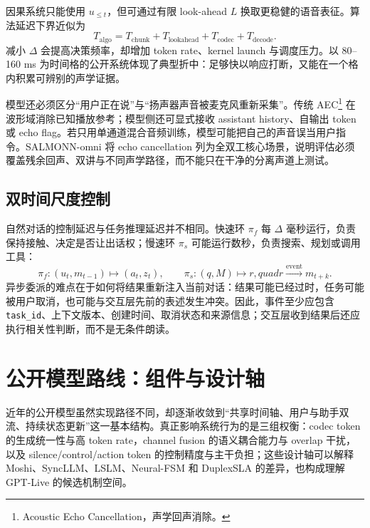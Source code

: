 因果系统只能使用 $u_{\le t}$，但可通过有限 look-ahead $L$ 换取更稳健的语音表征。算法延迟下界近似为
\begin{equation}
T_{\mathrm{algo}}=T_{\mathrm{chunk}}+T_{\mathrm{lookahead}}+T_{\mathrm{codec}}+T_{\mathrm{decode}}.
\end{equation}
减小 $\Delta$ 会提高决策频率，却增加 token rate、kernel launch 与调度压力。以 80--160 ms 为时间格的公开系统体现了典型折中：足够快以响应打断，又能在一个格内积累可辨别的声学证据\cite{defossez2024moshi,zhang2026duplexsla}。

模型还必须区分“用户正在说”与“扬声器声音被麦克风重新采集”。传统 AEC\footnote{Acoustic Echo Cancellation，声学回声消除。} 在波形域消除已知播放参考；模型侧还可显式接收 assistant history、自输出 token 或 echo flag。若只用单通道混合音频训练，模型可能把自己的声音误当用户指令。SALMONN-omni 将 echo cancellation 列为全双工核心场景\cite{yu2025salmonnomni}，说明评估必须覆盖残余回声、双讲与不同声学路径，而不能只在干净的分离声道上测试。

\subsection{双时间尺度控制}

自然对话的控制延迟与任务推理延迟并不相同。快速环 $\pi_f$ 每 $\Delta$ 毫秒运行，负责保持接触、决定是否让出话权；慢速环 $\pi_s$ 可能运行数秒，负责搜索、规划或调用工具：
\begin{equation}
\pi_f:(u_t,m_{t-1})\mapsto(a_t,z_t),\qquad
\pi_s:(q,M)\mapsto r,quad r\xrightarrow{\mathrm{event}}m_{t+k}.
\end{equation}
异步委派的难点在于如何将结果重新注入当前对话：结果可能已经过时，任务可能被用户取消，也可能与交互层先前的表述发生冲突。因此，事件至少应包含 \texttt{task\_id}、上下文版本、创建时间、取消状态和来源信息；交互层收到结果后还应执行相关性判断，而不是无条件朗读。

\section{公开模型路线：组件与设计轴}

近年的公开模型虽然实现路径不同，却逐渐收敛到“共享时间轴、用户与助手双流、持续状态更新”这一基本结构。真正影响系统行为的是三组权衡：codec token 的生成统一性与高 token rate，channel fusion 的语义耦合能力与 overlap 干扰，以及 silence/control/action token 的控制精度与主干负担；这些设计轴可以解释 Moshi、SyncLLM、LSLM、Neural-FSM 和 DuplexSLA 的差异，也构成理解 GPT-Live 的候选机制空间。


